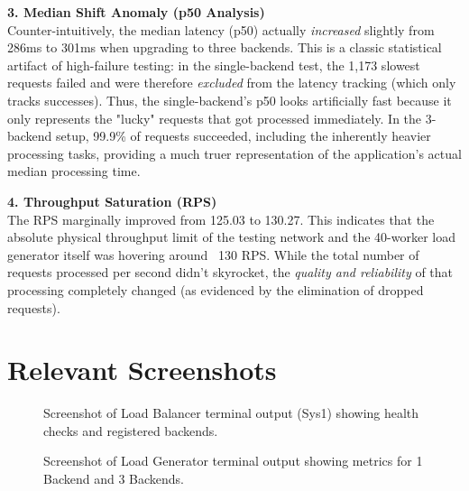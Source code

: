 \documentclass[12pt,a4paper]{article}
\begin{document}
\textbf{3. Median Shift Anomaly (p50 Analysis)} \\
Counter-intuitively, the median latency (p50) actually \textit{increased} slightly from 286ms to 301ms when upgrading to three backends. This is a classic statistical artifact of high-failure testing: in the single-backend test, the 1,173 slowest requests failed and were therefore \textit{excluded} from the latency tracking (which only tracks successes). Thus, the single-backend's p50 looks artificially fast because it only represents the "lucky" requests that got processed immediately. In the 3-backend setup, 99.9\% of requests succeeded, including the inherently heavier processing tasks, providing a much truer representation of the application's actual median processing time.

\textbf{4. Throughput Saturation (RPS)} \\
The RPS marginally improved from 125.03 to 130.27. This indicates that the absolute physical throughput limit of the testing network and the 40-worker load generator itself was hovering around ~130 RPS. While the total number of requests processed per second didn't skyrocket, the \textit{quality and reliability} of that processing completely changed (as evidenced by the elimination of dropped requests).

\section{Relevant Screenshots}

\begin{figure}[H]
    \centering
    \fbox{\rule{0pt}{2in} \rule{0.8\textwidth}{0pt}}
    \caption{Screenshot of Load Balancer terminal output (Sys1) showing health checks and registered backends.}
\end{figure}

\begin{figure}[H]
    \centering
    \fbox{\rule{0pt}{2in} \rule{0.8\textwidth}{0pt}}
    \caption{Screenshot of Load Generator terminal output showing metrics for 1 Backend and 3 Backends.}
\end{figure}

\newpage
\end{document}
